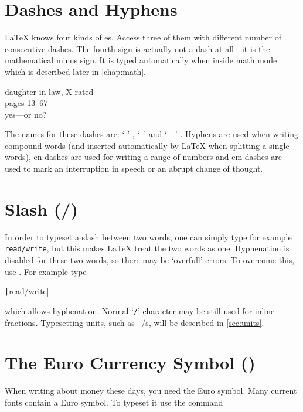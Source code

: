 \section{Dashes and Hyphens}

\LaTeX{} knows four kinds of es. Access three of them with different
number of consecutive dashes. The fourth sign is actually not a dash at
all---it is the mathematical minus sign. It is typed automatically when inside
math mode which is described later in \autoref{chap:math}.
\begin{example}
daughter-in-law, X-rated\\
pages 13--67\\
yes---or no?
\end{example}

The names for these dashes are: `-' \index{-}, `--'
\index{--} and `---' \index{---}. Hyphens are used when
writing compound words (and inserted automatically by \LaTeX{} when splitting a
single words), en-dashes are used for writing a range of numbers and em-dashes
are used to mark an interruption in speech or an abrupt change of thought.

\section{Slash (/)}

In order to typeset a slash between two words, one can simply type for example
\texttt{read/write}, but this makes \LaTeX{} treat the two words as one.
Hyphenation is disabled for these two words, so there may be
\enquote*{overfull} errors.  To overcome this, use .  For example
type
\begin{code}
  \texttt|read\slash write|
\end{code}
which allows hyphenation.  Normal
\enquote*{\texttt{/}} character may be still used for inline fractions.
Typesetting units, such as \unit[per-mode = symbol]{\mebi\byte\per\s}, will be
described in \autoref{sec:units}.

\section{The Euro Currency Symbol \texorpdfstring{(\officialeuro)}{}}

When writing about money these days, you need the Euro symbol. Many current
fonts contain a Euro symbol. To typeset it use the command
\begin{lscommand}
\end{lscommand}

